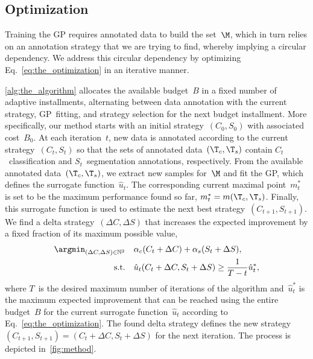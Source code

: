 \subsection{Optimization}

Training the GP requires annotated data to build the set~$\M$, which in turn relies on an annotation strategy that we are trying to find, whereby implying a circular dependency. We address this circular dependency by optimizing Eq.~\eqref{eq:the_optimization} in an iterative manner.

\cref{alg:the_algorithm} allocates the available budget~$B$ in a fixed number of adaptive installments, alternating between data annotation with the current strategy, GP~fitting, and strategy selection for the next budget installment. More specifically, our method starts with an initial strategy~$(C_0, S_0)$ with associated cost~$B_0$. At each iteration~$t$, new data is annotated according to the current strategy~$(C_t, S_t)$ so that the sets of annotated data~$(\T_c, \T_s)$ contain $C_t$~classification and $S_t$~segmentation annotations, respectively. From the available annotated data~$(\T_c, \T_s)$, we extract new samples for~$\M$ and fit the GP, which defines the surrogate function~$\hat{u}_t$. The corresponding current maximal point~$m^*_t$ is set to be the maximum performance found so far, $m^*_t=m(\T_c, \T_s)$. Finally, this surrogate function is used to estimate the next best strategy~$(C_{t+1}, S_{t+1})$. We find a delta strategy~$(\Delta{}C,\Delta{}S)$ that increases the expected improvement by a fixed fraction of its maximum possible value,
\begin{equation}
\begin{aligned}
    \argmin_{(\Delta{}C,\Delta{}S)\in\mathbb{N}^2} \quad & \alpha_c (C_t + \Delta{}C)+\alpha_s (S_t + \Delta{}S), \\
    \textrm{s.t.} \quad & \hat{u}_t(C_t + \Delta{}C, S_t + \Delta{}S) \ge \dfrac{1}{T - t}\hat{u}^*_t,
\end{aligned}
\label{eq:delta_strategy}
\end{equation}
where $T$~is the desired maximum number of iterations of the algorithm and~$\hat{u}_t^*$ is the maximum expected improvement that can be reached using the entire budget~$B$ for the current surrogate function~$\hat{u}_t$ according to Eq.~\eqref{eq:the_optimization}. The found delta strategy defines the new strategy~$(C_{t+1}, S_{t+1}) = (C_t + \Delta{}C, S_t + \Delta{}S)$ for the next iteration. The process is depicted in~\cref{fig:method}.

